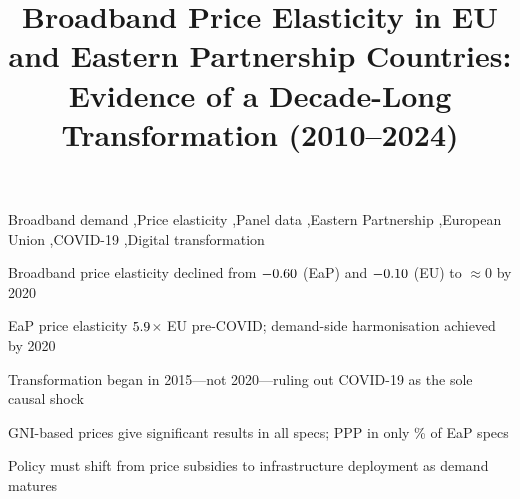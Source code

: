 \documentclass[preprint,review,12pt,authoryear]{styles/elsarticle}
\begin{document}
\makeatletter
\def\ps@pprintTitle{\let\@oddhead\@empty\let\@evenhead\@empty
    \let\@oddfoot\@empty\let\@evenfoot\@empty}
\makeatother

\begin{frontmatter}

\title{Broadband Price Elasticity in EU and Eastern Partnership Countries:
       Evidence of a Decade-Long Transformation (2010--2024)}


\begin{abstract}

\end{abstract}

\begin{keyword}
Broadband demand \sep Price elasticity \sep Panel data \sep Eastern
Partnership \sep European Union \sep COVID-19 \sep Digital transformation
\end{keyword}

\begin{highlights}
\item Broadband price elasticity declined from $-0.60$ (EaP) and $-0.10$
      (EU) to $\approx$0 by 2020
\item EaP price elasticity $5.9$$\times$ EU pre-COVID; demand-side
      harmonisation achieved by 2020
\item Transformation began in 2015---not 2020---ruling out COVID-19 as the sole
      causal shock
\item GNI-based prices give significant results in all specs; PPP in only
      \PctPPPSigEaP\% of EaP specs
\item Policy must shift from price subsidies to infrastructure deployment as
      demand matures
\end{highlights}

\end{frontmatter}

\linenumbers

\end{document}

